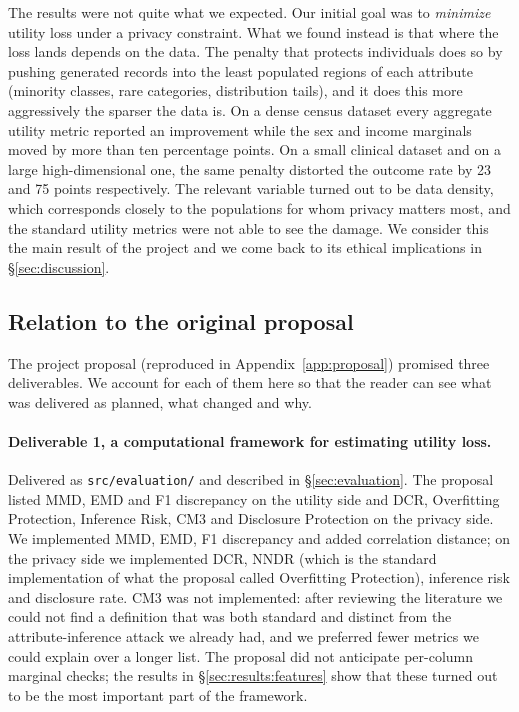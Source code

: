 \documentclass[11pt,a4paper]{article}
\begin{document}
The results were not quite what we expected. Our initial goal was to
\emph{minimize} utility loss under a privacy constraint. What we found instead
is that where the loss lands depends on the data. The penalty that protects
individuals does so by pushing generated records into the least populated
regions of each attribute (minority classes, rare categories, distribution
tails), and it does this more aggressively the sparser the data is. On a dense
census dataset every aggregate utility metric reported an improvement while the
sex and income marginals moved by more than ten percentage points. On a small
clinical dataset and on a large high-dimensional one, the same penalty
distorted the outcome rate by 23 and 75 points respectively. The relevant
variable turned out to be data density, which corresponds closely to the
populations for whom privacy matters most, and the standard utility metrics
were not able to see the damage. We consider this the main result of the
project and we come back to its ethical implications in
\S\ref{sec:discussion}.

\subsection{Relation to the original proposal}
\label{sec:proposal}

The project proposal (reproduced in Appendix~\ref{app:proposal}) promised
three deliverables. We account for each of them here so that the reader can
see what was delivered as planned, what changed and why.

\paragraph{Deliverable 1, a computational framework for estimating utility
loss.} Delivered as \texttt{src/evaluation/} and described in
\S\ref{sec:evaluation}. The proposal listed MMD, EMD and F1 discrepancy on the
utility side and DCR, Overfitting Protection, Inference Risk, CM3 and
Disclosure Protection on the privacy side. We implemented MMD, EMD, F1
discrepancy and added correlation distance; on the privacy side we implemented
DCR, NNDR (which is the standard implementation of what the proposal called
Overfitting Protection), inference risk and disclosure rate. CM3 was not
implemented: after reviewing the literature we could not find a definition
that was both standard and distinct from the attribute-inference attack we
already had, and we preferred fewer metrics we could explain over a longer
list. The proposal did not anticipate per-column marginal checks; the results
in \S\ref{sec:results:features} show that these turned out to be the most
important part of the framework.
\end{document}
